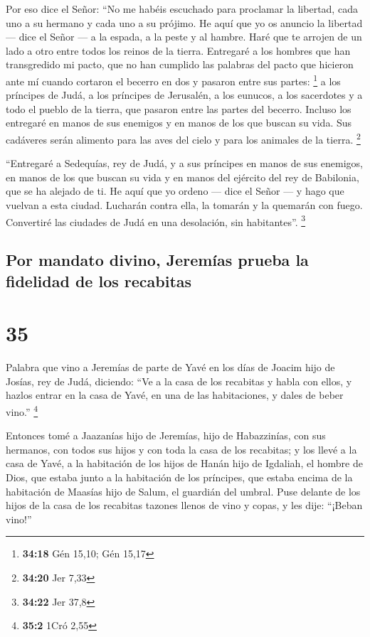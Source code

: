  Por eso dice el Señor: ``No me habéis escuchado para
proclamar la libertad, cada uno a su hermano y cada uno a su prójimo. He
aquí que yo os anuncio la libertad --- dice el Señor --- a la espada, a
la peste y al hambre. Haré que te arrojen de un lado a otro entre todos
los reinos de la tierra.  Entregaré a los hombres que han
transgredido mi pacto, que no han cumplido las palabras del pacto que
hicieron ante mí cuando cortaron el becerro en dos y pasaron entre sus
partes: \footnote{\textbf{34:18} Gén 15,10; Gén 15,17}  a
los príncipes de Judá, a los príncipes de Jerusalén, a los eunucos, a
los sacerdotes y a todo el pueblo de la tierra, que pasaron entre las
partes del becerro.  Incluso los entregaré en manos de
sus enemigos y en manos de los que buscan su vida. Sus cadáveres serán
alimento para las aves del cielo y para los animales de la tierra.
\footnote{\textbf{34:20} Jer 7,33}

 ``Entregaré a Sedequías, rey de Judá, y a sus príncipes
en manos de sus enemigos, en manos de los que buscan su vida y en manos
del ejército del rey de Babilonia, que se ha alejado de ti.
 He aquí que yo ordeno --- dice el Señor --- y hago que
vuelvan a esta ciudad. Lucharán contra ella, la tomarán y la quemarán
con fuego. Convertiré las ciudades de Judá en una desolación, sin
habitantes''. \footnote{\textbf{34:22} Jer 37,8}

\hypertarget{por-mandato-divino-jeremuxedas-prueba-la-fidelidad-de-los-recabitas}{%
\subsection{Por mandato divino, Jeremías prueba la fidelidad de los
recabitas}\label{por-mandato-divino-jeremuxedas-prueba-la-fidelidad-de-los-recabitas}}

\hypertarget{section-34}{%
\section{35}\label{section-34}}

 Palabra que vino a Jeremías de parte de Yavé en los días
de Joacim hijo de Josías, rey de Judá, diciendo:  ``Ve a
la casa de los recabitas y habla con ellos, y hazlos entrar en la casa
de Yavé, en una de las habitaciones, y dales de beber vino.''
\footnote{\textbf{35:2} 1Cró 2,55}

 Entonces tomé a Jaazanías hijo de Jeremías, hijo de
Habazzinías, con sus hermanos, con todos sus hijos y con toda la casa de
los recabitas;  y los llevé a la casa de Yavé, a la
habitación de los hijos de Hanán hijo de Igdaliah, el hombre de Dios,
que estaba junto a la habitación de los príncipes, que estaba encima de
la habitación de Maasías hijo de Salum, el guardián del umbral.
 Puse delante de los hijos de la casa de los recabitas
tazones llenos de vino y copas, y les dije: ``¡Beban vino!''

